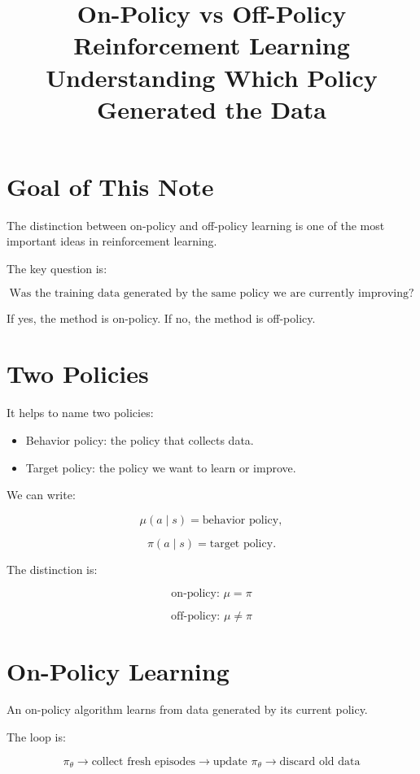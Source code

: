 \documentclass[11pt]{article}
\title{On-Policy vs Off-Policy Reinforcement Learning\\
\large Understanding Which Policy Generated the Data}
\author{}
\date{}
\begin{document}
\maketitle

\section{Goal of This Note}

The distinction between on-policy and off-policy learning is one of the most important ideas in reinforcement learning.

The key question is:

\[
\boxed{
\text{Was the training data generated by the same policy we are currently improving?}
}
\]

If yes, the method is on-policy.
If no, the method is off-policy.

\section{Two Policies}

It helps to name two policies:

\begin{itemize}[leftmargin=2em]
    \item Behavior policy: the policy that collects data.
    \item Target policy: the policy we want to learn or improve.
\end{itemize}

We can write:

\[
\mu(a \mid s) = \text{behavior policy},
\]

\[
\pi(a \mid s) = \text{target policy}.
\]

The distinction is:

\[
\boxed{
\text{on-policy: } \mu = \pi
}
\]

\[
\boxed{
\text{off-policy: } \mu \neq \pi
}
\]

\section{On-Policy Learning}

An on-policy algorithm learns from data generated by its current policy.

The loop is:

\[
\pi_\theta
\rightarrow
\text{collect fresh episodes}
\rightarrow
\text{update } \pi_\theta
\rightarrow
\text{discard old data}
\]
\end{document}
